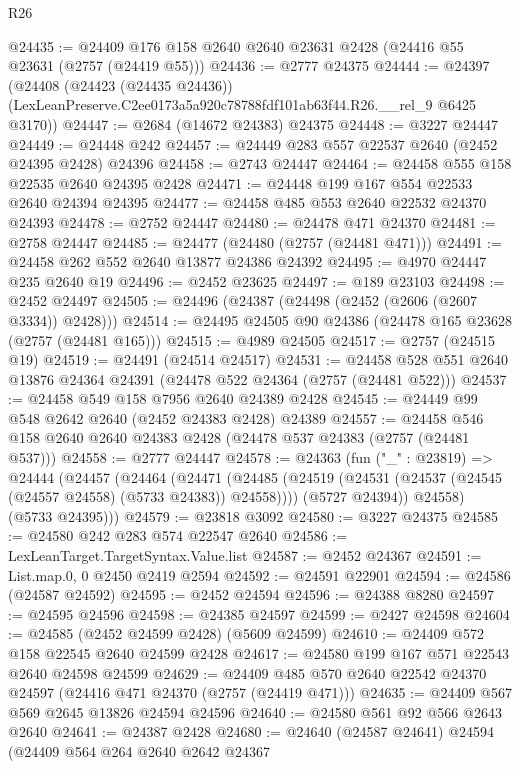 \begin{lexlean}{R26}
\begin{coremodule}
@24435 := @24409 @176 @158 @2640 @2640 @23631 @2428 (@24416 @55 @23631 (@2757 (@24419 @55)))
@24436 := @2777 @24375
@24444 := @24397
    (@24408
      (@24423 (@24435 @24436))
      (LexLeanPreserve.C2ee0173a5a920c78788fdf101ab63f44.R26.__rel_9 @6425 @3170))
@24447 := @2684 (@14672 @24383) @24375
@24448 := @3227 @24447
@24449 := @24448 @242
@24457 := @24449 @283 @557 @22537 @2640 (@2452 @24395 @2428) @24396
@24458 := @2743 @24447
@24464 := @24458 @555 @158 @22535 @2640 @24395 @2428
@24471 := @24448 @199 @167 @554 @22533 @2640 @24394 @24395
@24477 := @24458 @485 @553 @2640 @22532 @24370 @24393
@24478 := @2752 @24447
@24480 := @24478 @471 @24370
@24481 := @2758 @24447
@24485 := @24477 (@24480 (@2757 (@24481 @471)))
@24491 := @24458 @262 @552 @2640 @13877 @24386 @24392
@24495 := @4970 @24447 @235 @2640 @19
@24496 := @2452 @23625
@24497 := @189 @23103
@24498 := @2452 @24497
@24505 := @24496 (@24387 (@24498 (@2452 (@2606 (@2607 @3334)) @2428)))
@24514 := @24495 @24505 @90 @24386 (@24478 @165 @23628 (@2757 (@24481 @165)))
@24515 := @4989 @24505
@24517 := @2757 (@24515 @19)
@24519 := @24491 (@24514 @24517)
@24531 := @24458 @528 @551 @2640 @13876 @24364 @24391 (@24478 @522 @24364 (@2757 (@24481 @522)))
@24537 := @24458 @549 @158 @7956 @2640 @24389 @2428
@24545 := @24449 @99 @548 @2642 @2640 (@2452 @24383 @2428) @24389
@24557 := @24458 @546 @158 @2640 @2640 @24383 @2428 (@24478 @537 @24383 (@2757 (@24481 @537)))
@24558 := @2777 @24447
@24578 := @24363
    (fun ("_" : @23819) =>
    @24444
      (@24457
        (@24464
          (@24471
            (@24485 (@24519 (@24531 (@24537 (@24545 (@24557 @24558) (@5733 @24383)) @24558))))
            (@5727 @24394))
          @24558)
        (@5733 @24395)))
@24579 := @23818 @3092
@24580 := @3227 @24375
@24585 := @24580 @242 @283 @574 @22547 @2640
@24586 := LexLeanTarget.TargetSyntax.Value.list
@24587 := @2452 @24367
@24591 := List.map.{0, 0} @2450 @2419 @2594
@24592 := @24591 @22901
@24594 := @24586 (@24587 @24592)
@24595 := @2452 @24594
@24596 := @24388 @8280
@24597 := @24595 @24596
@24598 := @24385 @24597
@24599 := @2427 @24598
@24604 := @24585 (@2452 @24599 @2428) (@5609 @24599)
@24610 := @24409 @572 @158 @22545 @2640 @24599 @2428
@24617 := @24580 @199 @167 @571 @22543 @2640 @24598 @24599
@24629 := @24409 @485 @570 @2640 @22542 @24370 @24597 (@24416 @471 @24370 (@2757 (@24419 @471)))
@24635 := @24409 @567 @569 @2645 @13826 @24594 @24596
@24640 := @24580 @561 @92 @566 @2643 @2640
@24641 := @24387 @2428
@24680 := @24640
    (@24587 @24641)
    @24594
    (@24409
      @564
      @264
      @2640
      @2642
      @24367

\end{coremodule}
\end{lexlean}
